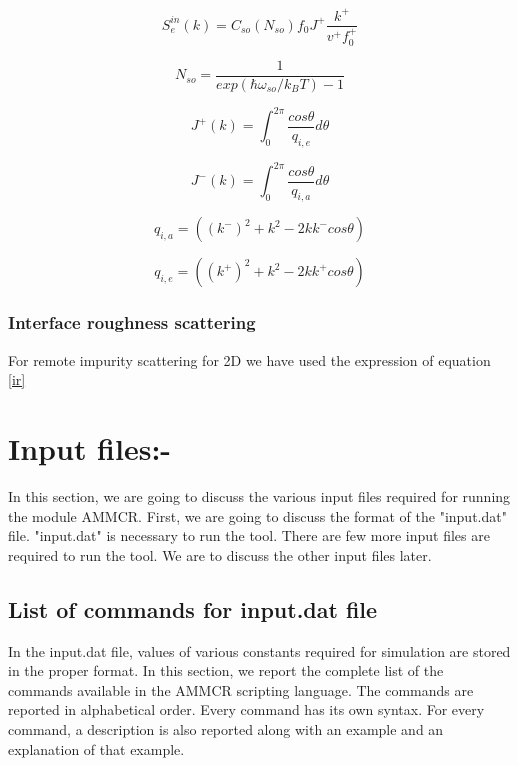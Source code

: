 \documentclass[12pt]{article}
\begin{document}
\begin{equation}
S_{e}^{in}(k) = C_{so} (N_{so}) f_{0}  J^+\frac{k^+}{v^+ f_{0}^+}
\label{ab_in_sc_so}
\end{equation}


\begin{equation}
N_{so} = \frac{1}{exp(\hbar\omega_{so}/k_B T) - 1}
\label{N_so}
\end{equation}

\begin{equation}
J^{+}(k) = \int_0^{2\pi} \frac{cos \theta}{q_{i,e}}  d\theta 
\label{J_plus_so}
\end{equation}

\begin{equation}
J^{-}(k) = \int_0^{2\pi} \frac{cos \theta}{q_{i,a}} d\theta 
\label{J_minus_so}
\end{equation}

\begin{equation}
q_{i,a} = \left( \left( k^{-}\right)^2 + k^2 - 2k k^{-} cos \theta \right)
\label{q_ab_so}
\end{equation}

\begin{equation}
q_{i,e} = \left( \left( k^{+}\right)^2 + k^2  - 2k k^{+} cos \theta \right)
\label{q_em_so}
\end{equation}

\subsubsection{Interface roughness scattering}
For remote impurity scattering for 2D we have used the expression of equation \ref{ir}


\section{Input files:-} \label{input_files}
In this section, we are going to discuss the various input files required for running the module AMMCR. First, we are going to discuss the format of the "input.dat" file. "input.dat" is necessary to run the tool. There are few more input files are required to run the tool. We are to discuss the other input files later. 

\subsection{List of commands for input.dat file}
In the input.dat file, values of various constants required for simulation are stored in the proper format. In this section, we report the complete list of the commands available in the AMMCR scripting language. The commands are reported in alphabetical order. Every command has its own syntax. For every command, a description is also reported along with an example and an explanation of that example.
\end{document}
